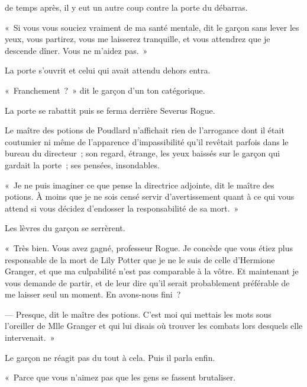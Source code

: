 
 de temps après, il y eut un autre coup contre la porte du débarras.

\hplettrineextrapara
«~Si vous vous souciez vraiment de ma santé mentale, dit le garçon sans lever les yeux, vous partirez, vous me laisserez tranquille, et vous attendrez que je descende dîner. Vous ne m'aidez pas.~»

La porte s'ouvrit et celui qui avait attendu dehors entra.

«~Franchement~?~» dit le garçon d'un ton catégorique.

La porte se rabattit puis se ferma derrière Severus Rogue.

Le maître des potions de Poudlard n'affichait rien de l'arrogance dont il était coutumier ni même de l'apparence d'impassibilité qu'il revêtait parfois dans le bureau du directeur~; son regard, étrange, les yeux baissés sur le garçon qui gardait la porte~; ses pensées, insondables.

«~Je ne puis imaginer ce que pense la directrice adjointe, dit le maître des potions. À moins que je ne sois censé servir d'avertissement quant à ce qui vous attend si vous décidez d'endosser la responsabilité de sa mort.~»

Les lèvres du garçon se serrèrent.

«~Très bien. Vous avez gagné, professeur Rogue. Je concède que vous étiez plus responsable de la mort de Lily Potter que je ne le suis de celle d'Hermione Granger, et que ma culpabilité n'est pas comparable à la vôtre. Et maintenant je vous demande de partir, et de leur dire qu'il serait probablement préférable de me laisser seul un moment. En avons-nous fini~?

--- Presque, dit le maître des potions. C'est moi qui mettais les mots sous l'oreiller de Mlle Granger et qui lui disais où trouver les combats lors desquels elle intervenait.~»

Le garçon ne réagit pas du tout à cela. Puis il parla enfin.

«~Parce que vous n'aimez pas que les gens se fassent brutaliser.

